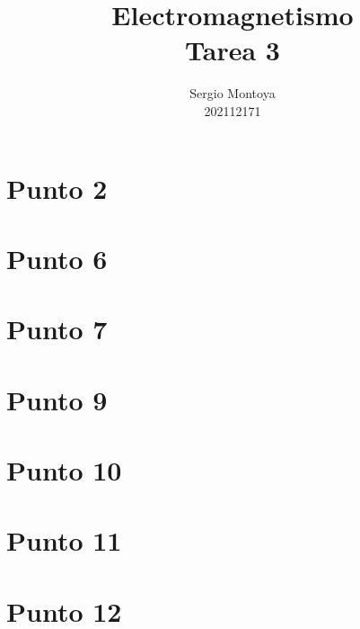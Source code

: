 \documentclass{report}
\title{\Huge{Electromagnetismo}\\Tarea 3}
\author{\huge{Sergio Montoya} \\ 202112171}
\date{}
\begin{document}
\maketitle
\newpage%
\tableofcontents
\pagebreak

\chapter{Punto 2}

\chapter{Punto 6}

\chapter{Punto 7}

\chapter{Punto 9}

\chapter{Punto 10}

\chapter{Punto 11}

\chapter{Punto 12}
\end{document}
